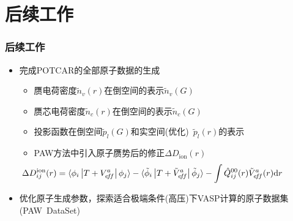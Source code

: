 \documentclass[cjk,slidestop,compress,mathserif,blue]{beamer}
\begin{document}
\section{后续工作}
\frame
{
	\frametitle{后续工作}
	\begin{itemize}
		\item 完成\textrm{POTCAR}的全部原子数据的生成
			\begin{itemize}
   				\setlength{\itemsep}{10pt}
				\item 赝电荷密度$\tilde n_v(r)$在倒空间的表示$\tilde n_v(G)$
				\item 赝芯电荷密度$\tilde n_c(r)$在倒空间的表示$\tilde n_c(G)$
				\item 投影函数在倒空间$\tilde p_l(G)$和实空间(优化)~$\tilde p_l(r)$的表示
				\item \textrm{PAW}方法中引入原子赝势后的修正$\Delta D_{\mathrm{ion}}(r)$
					\begin{displaymath}
						\hspace*{-50pt}\Delta D_{ij}^{\mathrm{ion}}(r)=\langle\phi_i\left|T+V_{e\!f\!f}^a\right|\phi_j\rangle-\langle\tilde\phi_i\left|T+\tilde V_{e\!f\!f}^a\right|\tilde\phi_j\rangle-\int\hat{Q}_{ij}^{00}(r)\tilde{V}_{e\!f\!f}^a(r)\mathrm{d}r 
					\end{displaymath}
			\end{itemize}
		\item 优化原子生成参数，探索适合极端条件(高压)下\textrm{VASP}计算的原子数据集(\textrm{PAW~DataSet})
	\end{itemize}
}


\end{document}
